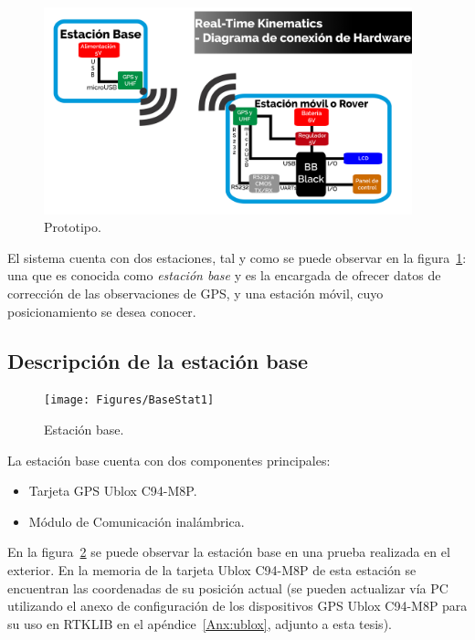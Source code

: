 \begin{figure}[H]
\centering
\includegraphics[width=0.95\textwidth]{Figures/DiagFinal}
\caption[Prototipo.]{Prototipo.}
\label{fig:diaghard}
\end{figure}

El sistema cuenta con dos estaciones, tal y como se puede observar en la figura~\ref{fig:diaghard}:  una que es conocida como \textit{estación base} y es la encargada de ofrecer datos de corrección de las observaciones de GPS, y una estación móvil, cuyo posicionamiento se desea conocer. 

\subsection{Descripción de la estación base}

\begin{figure}[H]
\centering
\texttt{[image: Figures/BaseStat1]}
\caption[Estación base.]{Estación base.}
\label{fig:estbase}
\end{figure}

La estación base cuenta con dos componentes principales:

\begin{itemize}
\item Tarjeta GPS Ublox C94-M8P.
\item Módulo de Comunicación inalámbrica.
\end{itemize}

En la figura~\ref{fig:estbase} se puede observar la estación base en una prueba realizada en el exterior. En la memoria de la tarjeta Ublox C94-M8P de esta estación se encuentran las coordenadas de su posición actual (se pueden actualizar vía PC utilizando el anexo de configuración de los dispositivos GPS Ublox C94-M8P para su uso en RTKLIB en el apéndice~\ref{Anx:ublox}, adjunto a esta tesis).\\

